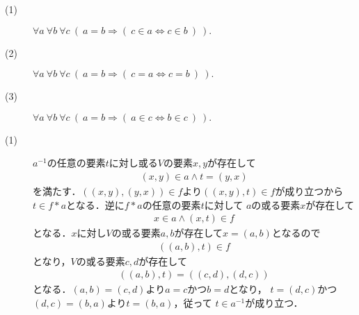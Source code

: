 	\begin{screen}
		\begin{axm}[相等性の公理]\mbox{}
			\begin{description}
				\item[(1)] $\forall a\ \forall b\ \forall c\ \left(\ a=b \Longrightarrow (\ c \in a \Longleftrightarrow c \in b\ )\ \right).$
				\item[(2)] $\forall a\ \forall b\ \forall c\ \left(\ a=b \Longrightarrow (\ c = a \Longleftrightarrow c = b\ )\ \right).$
				\item[(3)] $\forall a\ \forall b\ \forall c\ \left(\ a=b \Longrightarrow (\ a \in c \Longleftrightarrow b \in c\ )\ \right).$
			\end{description}
		\end{axm}
	\end{screen}
	
	\begin{screen}
		\begin{thm}
			
		\end{thm}
	\end{screen}
	
	\begin{prf}\mbox{}
		\begin{description}
			\item[(1)] $a^{-1}$の任意の要素$t$に対し或る$V$の要素$x,y$が存在して
				\begin{align}
					(x,y) \in a \wedge t = (y,x)
				\end{align}
				を満たす．$((x,y),(y,x)) \in f$より$((x,y),t) \in f$が成り立つから
				$t \in f \ast a$となる．逆に$f \ast a$の任意の要素$t$に対して
				$a$の或る要素$x$が存在して
				\begin{align}
					x \in a \wedge (x,t) \in f
				\end{align}
				となる．$x$に対し$V$の或る要素$a,b$が存在して$x=(a,b)$となるので
				\begin{align}
					((a,b),t) \in f
				\end{align}
				となり，$V$の或る要素$c,d$が存在して
				\begin{align}
					((a,b),t) = ((c,d),(d,c))
				\end{align}
				となる．$(a,b) = (c,d)$より$a=c$かつ$b=d$となり，
				$t = (d,c)$かつ$(d,c)=(b,a)$より$t=(b,a)$，従って
				$t \in a^{-1}$が成り立つ．
		\end{description}
	\end{prf}